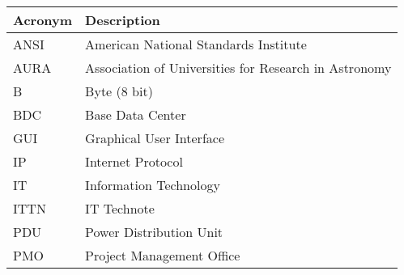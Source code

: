 \addtocounter{table}{-1}
\begin{longtable}{p{}p{}}\hline
\textbf{Acronym} & \textbf{Description}  \\\hline

ANSI & American National Standards Institute \\\hline
AURA & Association of Universities for Research in Astronomy \\\hline
B & Byte (8 bit) \\\hline
BDC &  Base Data Center \\\hline
GUI & Graphical User Interface \\\hline
IP & Internet Protocol \\\hline
IT & Information Technology \\\hline
ITTN & IT Technote \\\hline
PDU & Power Distribution Unit \\\hline
PMO & Project Management Office \\\hline
\end{longtable}
